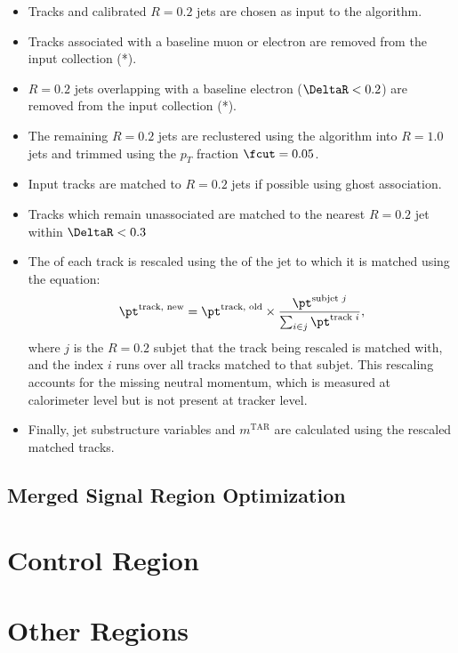 \begin{itemize}
  \item Tracks and calibrated \akt $R=0.2$ jets are chosen as input to the algorithm.
  \item Tracks associated with a baseline muon or electron are removed from the input collection (*).
  \item \akt $R=0.2$ jets overlapping with a baseline electron ($\DeltaR<0.2$) are removed from the input collection (*).
  \item The remaining \akt $R=0.2$ jets are reclustered using the \akt algorithm into $R=1.0$ jets and trimmed using the $p_T$ fraction \(\fcut=0.05\).
  \item Input tracks are matched to $R=0.2$ jets if possible using ghost association.
  \item Tracks which remain unassociated are matched to the nearest \akt $R=0.2$ jet within $\DeltaR<0.3$
  \item The \pt of each track is rescaled using the \pt of the jet to which it is matched using the equation:
  \begin{equation}
  \pt^{\text{track, new}} = \pt^{\text{track, old}}\times \frac{\pt^{\text{subjet $j$}}}{\sum_{i \in j} \pt^{\text{track $i$}}} ,
  \label{eq:TAR_rescale}
  \end{equation}  where $j$ is the $R=0.2$ subjet that the track being rescaled is matched with, and the index $i$ runs over all tracks matched to that subjet. This rescaling accounts for the missing neutral momentum, which is measured at calorimeter level but is not present at tracker level.
  \item Finally, jet substructure variables and  $m^\text{TAR}$ are calculated using the rescaled matched tracks.
\end{itemize}




\subsection{Merged Signal Region Optimization}

\section{\ttbar Control Region}

\section{Other Regions}
